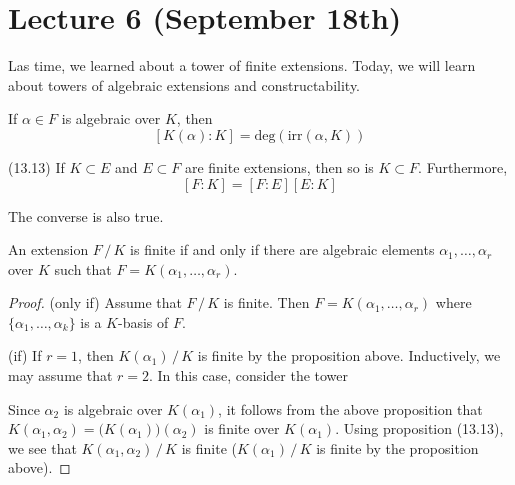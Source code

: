 \section{Lecture 6 (September 18th)}
\begin{rmk}
Las time, we learned about a tower of finite extensions. Today, we will learn about towers of algebraic extensions and constructability.
\end{rmk}
\vspace{2ex}
\begin{prop}
If $\alpha \in F$ is algebraic over $K$, then 
\[[K(\alpha ):K]=\mathrm{deg}(\mathrm{irr}(\alpha ,K))\]
\end{prop}
\vspace{2ex}
\begin{prop}
(13.13) If $K\subset E$ and $E\subset F$ are finite extensions, then so is $K\subset F$. Furthermore,
\[[F:K]=[F:E][E:K]\]
\end{prop}
\vspace{2ex}
\begin{rmk}
The converse is also true.
\end{rmk}
\vspace{2ex}
\begin{prop}
An extension $F\,/\,K$ is finite if and only if there are algebraic elements $\alpha_1,\ldots ,\alpha _{r}$ over $K$ such that $F=K(\alpha_1,\ldots ,\alpha _{r})$.
\end{prop}
\vspace{2ex}
\begin{proof}
(only if) Assume that $F\,/\,K$ is finite. Then $F=K(\alpha_1,\ldots ,\alpha _{r})$ where $\{ \alpha_1,\ldots,\alpha _{k}\}$ is a $K$-basis of $F$. 

\bigskip

(if) If $r=1$, then $K(\alpha_1)\,/\,K$ is finite by the proposition above. Inductively, we may assume that $r=2$. In this case, consider the tower
\begin{center}
\end{center}
Since $\alpha_2$ is algebraic over $K(\alpha _1)$, it follows from the above proposition that $K(\alpha_1,\alpha _2)=\Big(K(\alpha_1)\Big)(\alpha_2)$ is finite over $K(\alpha_1)$. Using proposition (13.13), we see that $K(\alpha_1,\alpha_2)\,/\,K$ is finite ($K(\alpha_1)\,/\,K$ is finite by the proposition above). 
\end{proof}
